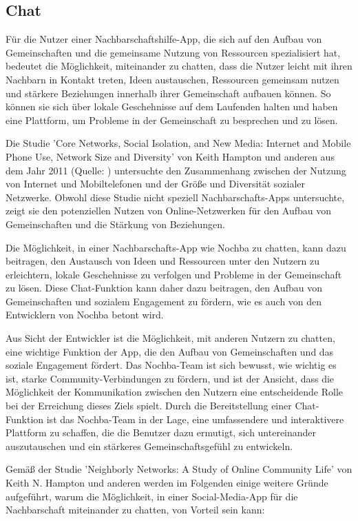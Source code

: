 \subsection{Chat}

Für die Nutzer einer Nachbarschaftshilfe-App, die sich auf den Aufbau von Gemeinschaften und die gemeinsame Nutzung von Ressourcen spezialisiert hat, bedeutet die Möglichkeit, miteinander zu chatten, dass die Nutzer leicht mit ihren Nachbarn in Kontakt treten, Ideen austauschen, Ressourcen gemeinsam nutzen und stärkere Beziehungen innerhalb ihrer Gemeinschaft aufbauen können. So können sie sich über lokale Geschehnisse auf dem Laufenden halten und haben eine Plattform, um Probleme in der Gemeinschaft zu besprechen und zu lösen.

Die Studie 'Core Networks, Social Isolation, and New Media: Internet and Mobile Phone Use, Network Size and Diversity' von Keith Hampton und anderen aus dem Jahr 2011 (Quelle: \cite{hampton2011core} ) untersuchte den Zusammenhang zwischen der Nutzung von Internet und Mobiltelefonen und der Größe und Diversität sozialer Netzwerke. Obwohl diese Studie nicht speziell Nachbarschafts-Apps untersuchte, zeigt sie den potenziellen Nutzen von Online-Netzwerken für den Aufbau von Gemeinschaften und die Stärkung von Beziehungen.

Die Möglichkeit, in einer Nachbarschafts-App wie Nochba zu chatten, kann dazu beitragen, den Austausch von Ideen und Ressourcen unter den Nutzern zu erleichtern, lokale Geschehnisse zu verfolgen und Probleme in der Gemeinschaft zu lösen. Diese Chat-Funktion kann daher dazu beitragen, den Aufbau von Gemeinschaften und sozialem Engagement zu fördern, wie es auch von den Entwicklern von Nochba betont wird.

Aus Sicht der Entwickler ist die Möglichkeit, mit anderen Nutzern zu chatten, eine wichtige Funktion der App, die den Aufbau von Gemeinschaften und das soziale Engagement fördert. Das Nochba-Team ist sich bewusst, wie wichtig es ist, starke Community-Verbindungen zu fördern, und ist der Ansicht, dass die Möglichkeit der Kommunikation zwischen den Nutzern eine entscheidende Rolle bei der Erreichung dieses Ziels spielt. Durch die Bereitstellung einer Chat-Funktion ist das Nochba-Team in der Lage, eine umfassendere und interaktivere Plattform zu schaffen, die die Benutzer dazu ermutigt, sich untereinander auszutauschen und ein stärkeres Gemeinschaftsgefühl zu entwickeln.

Gemäß der Studie 'Neighborly Networks: A Study of Online Community Life' von Keith N. Hampton und anderen werden im Folgenden einige weitere Gründe aufgeführt, warum die Möglichkeit, in einer Social-Media-App für die Nachbarschaft miteinander zu chatten, von Vorteil sein kann:

